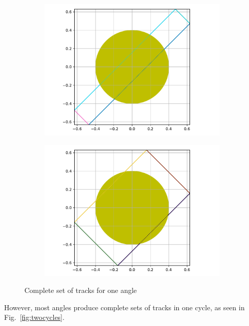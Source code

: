 \documentclass[12pt]{article}
\begin{document}
\begin{figure}[H]
\begin{subfigure}[b]{0.45\textwidth}
            \includegraphics[width=\textwidth]{figs/Ninety4.pdf}
        \end{subfigure}
        \quad
        \begin{subfigure}[b]{0.45\textwidth}   
            \centering 
            \includegraphics[width=\textwidth]{figs/Ninety3.pdf}
        \end{subfigure}
        \caption{Complete set of tracks for one angle}
        \label{fig:fourcycles}
    \end{figure}

However, most angles produce complete sets of tracks in one cycle, as seen in Fig.~\ref{fig:twocycles}.
\end{document}
